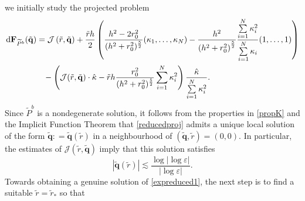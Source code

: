 \documentclass[11pt,reqno,a4paper]{amsart}
\numberwithin{equation}{section}
\def\dd{{\mathrm{d}}}
\newcommand{\defeq}{\mathrel{\mathop:}=}
\newcommand{\ve}{\varepsilon}
\begin{document}
we initially study the projected problem
\begin{equation}\label{reducedproj}
\begin{aligned}
\dd\mathbf{F}_{\widetilde{P}^{b}}(\tilde{\mathbf{q}})&=\mathcal{J}\left(\tilde{r},\tilde{\mathbf{q}}\right)+\frac{\tilde{r}h}{2}\left(\frac{h^2-2r_0^2}{(h^2+r_0^2)^{\frac 5 2}}(\kappa_1,\dots,\kappa_N) -\frac{h^2}{\left(h^2+r_0^2\right)^{\frac 5 2}}\frac{\sum\limits_{i=1}^{N} \kappa_i^2}{\sum\limits_{i=1}^{N}\kappa_i}(1,\dots,1)\right)\\
&\hspace{3mm}-\left(\mathcal{J}(\tilde{r},\tilde{\mathbf{q}})\cdot\hat\kappa-
\tilde{r}h\frac{r_0^2}{(h^2+r_0^2)^{\frac 5 2}}\sum_{i=1}^{N}\kappa_i^2\right)\frac{\hat\kappa}{\sum\limits_{i=1}^{N}\kappa_i^2}.
\end{aligned}
\end{equation}
Since $\widetilde{P}^{b}$ is a nondegenerate solution, it follows from the properties in \eqref{propK} and the Implicit Function Theorem that \eqref{reducedproj} admits a unique local solution of the form $\tilde{\mathbf{q}}\defeq \tilde{\mathbf{q}}(\tilde{r})$ in a neighbourhood of $(\tilde{\mathbf{q}},\tilde{r})=(0,0)$. In particular, the estimates of $\mathcal{J}(\tilde r,\tilde{\mathbf{q}})$ imply that this solution satisfies  \[|\tilde{\mathbf{q}}(\tilde r)|\lesssim \frac{\log|\log\ve|}{|\log\ve|}.\]
Towards obtaining a genuine solution of \eqref{expreduced1}, the next step is to find a suitable  $\tilde{r}=\tilde{r}_{*}$ so that
\end{document}
